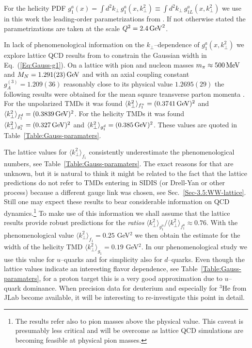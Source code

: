 \documentclass[a4paper,11pt]{article}
\newcommand{\la}{\langle}
\newcommand{\ra}{\rangle}
\def\kperp{k_\perp}
\def\avkperp{\la \kperp^2 \ra}
\begin{document}
For the helicity PDF $g_1^a(x)=\int d^2k_\perp\,g_1^a(x,k_\perp^2)\equiv 
\int d^2k_\perp\,g_{1L}^a(x,k_\perp^2)$ we use in this work the leading-order 
parametrizations from \cite{Gluck:1998xa}.
If not otherwise stated the parametrizations are taken at the scale 
$Q^2=2.4\,{\rm GeV}^2$.

In lack of phenomenological information on the $k_\perp$--dependence of
$g_1^a(x,k_\perp^2)$ we explore lattice QCD results from \cite{Hagler:2009mb}
to constrain the Gaussian width in Eq.~(\ref{Eq:Gauss-g1}). 
On a lattice with pion and nucleon masses 
$m_\pi\approx 500\,{\rm MeV}$ and $M_N=1.291(23)\,{\rm GeV}$ 
and with an axial coupling constant $g_A^{(3)}= 1.209(36)$ reasonably
close to its physical value $1.2695(29)$ the following results were
obtained for the mean square transverse parton momenta \cite{Hagler:2009mb}.
For the unpolarized TMDs it was found
$\langle \kperp^2 \rangle_{f_1^u} = (0.3741\,{\rm GeV})^2$ and
$\langle \kperp^2 \rangle_{f_1^d} = (0.3839\,{\rm GeV})^2$.
For the helicity TMDs it was found
$\avkperp_{g_1^u} = (0.327\,{\rm GeV})^2$ and
$\avkperp_{g_1^d} = (0.385\,{\rm GeV})^2$. 
These values are quoted in Table~\ref{Table:Gauss-paramaters}.

The lattice values for $\langle \kperp^2 \rangle_{f_1}$ consistently 
underestimate the phenomenological numbers, see 
Table~\ref{Table:Gauss-paramaters}.
The exact reasons for that are unknown, but it is natural to think it
might be related to the fact that the lattice predictions \cite{Hagler:2009mb}
do not refer to TMDs entering in SIDIS (or Drell-Yan or other process) 
because a different gauge link was chosen, see Sec.~\ref{Sec-3.5:WW-lattice}. 
Still one may expect these results to bear considerable information 
on QCD dynamics.\footnote{
	The results \cite{Hagler:2009mb} refer also to pion masses above the 
	physical value. This caveat is presumably less critical and
	will be overcome as lattice QCD simulations are becoming feasible 
	at physical pion masses.}
To make use of this information we shall assume that the lattice results
\cite{Hagler:2009mb} provide robust predictions for the {\it ratios}
$\langle \kperp^2 \rangle_{g_1^u}/\langle \kperp^2 \rangle_{f_1^u}\approx 0.76$.
With the phenomenological value $\langle \kperp^2 \rangle_{f_1} = 0.25$ GeV$^2$ 
we then obtain the estimate for the width of the helicity TMD
$\langle \kperp^2 \rangle_{g_1} = 0.19$ GeV$^2$.
In our phenomenological study we use this value for $u$--quarks and for 
simplicity also for $d$--quarks. Even though the lattice values indicate 
an interesting flavor dependence, see Table~\ref{Table:Gauss-paramaters},
for a proton target this is a very good approximation due to $u$--quark 
dominance. When precision data for deuterium and especially for $^3$He
from JLab become available, it will be interesting to 
re-investigate this point in detail.
\end{document}

